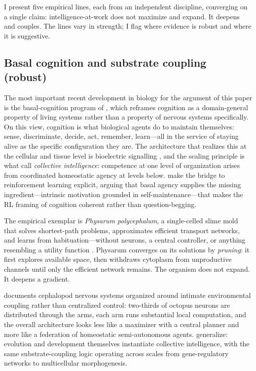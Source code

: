 \documentclass[11pt,a4paper,twocolumn]{article}
\begin{document}
I present five empirical lines, each from an independent discipline,
converging on a single claim: intelligence-at-work does not maximize and
expand. It deepens and couples. The lines vary in strength; I flag where
evidence is robust and where it is suggestive.

\subsection{Basal cognition and substrate coupling (robust)}

The most important recent development in biology for the argument of
this paper is the basal-cognition program of \citet{lyon2021}, which
reframes cognition as a domain-general property of living systems rather
than a property of nervous systems specifically. On this view, cognition
is what biological agents do to maintain themselves: sense, discriminate,
decide, act, remember, learn---all in the service of staying alive as
the specific configuration they are. The architecture that realizes this
at the cellular and tissue level is bioelectric signalling
\citep{levin2023}, and the scaling principle is what \citet{mcmillen2024}
call \emph{collective intelligence}: competence at one level of
organization arises from coordinated homeostatic agency at levels below.
\citet{seifert2024} make the bridge to reinforcement learning explicit,
arguing that basal agency supplies the missing ingredient---intrinsic
motivation grounded in self-maintenance---that makes the RL framing of
cognition coherent rather than question-begging.

The empirical exemplar is \textit{Physarum polycephalum}, a single-celled
slime mold that solves shortest-path problems, approximates efficient
transport networks, and learns from habituation---without neurons, a
central controller, or anything resembling a utility function
\citep{tero2010,reid2023}. Physarum converges on its solutions by
\emph{pruning}: it first explores available space, then withdraws
cytoplasm from unproductive channels until only the efficient network
remains. The organism does not expand. It deepens a gradient.

\citet{godfrey2016} documents cephalopod nervous systems organized
around intimate environmental coupling rather than centralized control:
two-thirds of octopus neurons are distributed through the arms, each
arm runs substantial local computation, and the overall architecture
looks less like a maximizer with a central planner and more like a
federation of homeostatic semi-autonomous agents. \citet{watson2023}
generalize: evolution and development themselves instantiate collective
intelligence, with the same substrate-coupling logic operating across
scales from gene-regulatory networks to multicellular morphogenesis.
\end{document}
